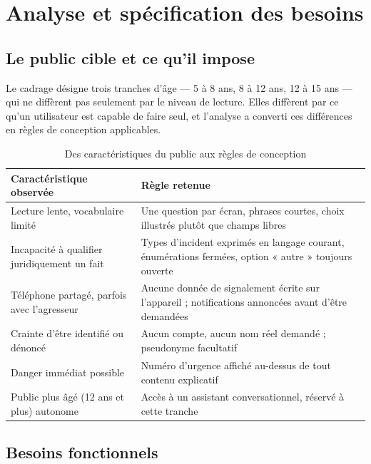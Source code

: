 \documentclass[11pt,a4paper,oneside,openany]{report}
\begin{document}
\chapter{Analyse et spécification des besoins}
\label{chap:besoins}

\section{Le public cible et ce qu'il impose}

Le cadrage désigne trois tranches d'âge — 5 à 8 ans, 8 à 12 ans, 12 à 15 ans —
qui ne diffèrent pas seulement par le niveau de lecture. Elles diffèrent par ce
qu'un utilisateur est capable de faire seul, et l'analyse a converti ces
différences en règles de conception applicables.

\begin{table}[htbp]
\centering
\small
\caption{Des caractéristiques du public aux règles de conception}
\label{tab:public}
\begin{tabularx}{\textwidth}{@{}L{4.1cm} X@{}}
\toprule
\textbf{Caractéristique observée} & \textbf{Règle retenue} \\
\midrule
Lecture lente, vocabulaire limité & Une question par écran, phrases courtes,
choix illustrés plutôt que champs libres \\
Incapacité à qualifier juridiquement un fait & Types d'incident exprimés en
langage courant, énumérations fermées, option « autre » toujours ouverte \\
Téléphone partagé, parfois avec l'agresseur & Aucune donnée de signalement
écrite sur l'appareil ; notifications annoncées avant d'être demandées \\
Crainte d'être identifié ou dénoncé & Aucun compte, aucun nom réel demandé ;
pseudonyme facultatif \\
Danger immédiat possible & Numéro d'urgence affiché au-dessus de tout contenu
explicatif \\
Public plus âgé (12 ans et plus) autonome & Accès à un assistant conversationnel,
réservé à cette tranche \\
\bottomrule
\end{tabularx}
\end{table}

\section{Besoins fonctionnels}
\end{document}
